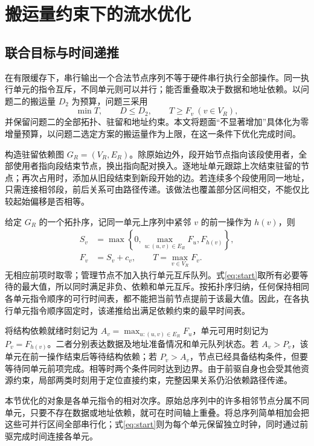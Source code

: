 \section{搬运量约束下的流水优化}
\subsection{联合目标与时间递推}
在有限缓存下，串行输出一个合法节点序列不等于硬件串行执行全部操作。同一执行单元的指令互斥，不同单元则可以并行；能否重叠取决于数据和地址依赖。以问题二的搬运量 $D_2$ 为预算，问题三采用
\begin{equation}
\min T,\qquad D\le D_2,\qquad T\ge F_v\ (v\in V_R),\label{eq:budget}
\end{equation}
并保留问题二的全部拓扑、驻留和地址约束。本文将题面“不显著增加”具体化为零增量预算，以问题二选定方案的搬运量作为上限，在这一条件下优化完成时间。

构造驻留依赖图 $G_R=(V_R,E_R)$。除原始边外，段开始节点指向该段使用者，全部使用者指向段结束节点，换出指向配对换入。逐地址单元跟踪上次结束驻留的节点；再次占用时，添加从旧段结束到新段开始的边。若连续多个段使用同一地址，只需连接相邻段，前后关系可由路径传递。该做法也覆盖部分区间相交，不能仅比较起始偏移是否相等。

给定 $G_R$ 的一个拓扑序，记同一单元上序列中紧邻 $v$ 的前一操作为 $h(v)$，则
\begin{align}
S_v&=\max\left\{0,\max_{u:(u,v)\in E_R}F_u,F_{h(v)}\right\},\label{eq:start}\\
F_v&=S_v+c_v,\qquad T=\max_{v\in V_R}F_v.\label{eq:finish}
\end{align}
无相应前项时取零；管理节点不加入执行单元互斥队列。式\eqref{eq:start}取所有必要等待的最大值，所以同时满足非负、依赖和单元互斥。按拓扑序归纳，任何保持相同各单元指令顺序的可行时间表，都不能把当前节点提前于该最大值。因此，在各执行单元指令顺序固定时，该递推给出满足依赖约束的最早时间表。

将结构依赖就绪时刻记为 $A_v=\max_{u:(u,v)\in E_R}F_u$，单元可用时刻记为 $P_v=F_{h(v)}$。二者分别表达数据及地址准备情况和单元队列状态。若 $A_v>P_v$，该单元在前一操作结束后等待结构依赖；若 $P_v>A_v$，节点已经具备结构条件，但要等待同单元前项完成。相等时两个条件同时达到边界。由于前驱自身也会受其他资源约束，局部两类时刻用于定位直接约束，完整因果关系仍沿依赖路径传递。

本节优化的对象是各单元指令的相对次序。原始总序列中的许多相邻节点分属不同单元，只要不存在数据或地址依赖，就可在时间轴上重叠。将总序列简单相加会把这些可并行区间全部串行化；式\eqref{eq:start}则为每个单元保留独立时钟，同时通过前驱完成时间连接各单元。


